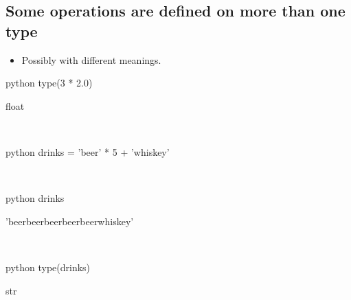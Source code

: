 \documentclass[aspectratio=1610,slidestop]{beamer}
\begin{document}
\subsection{Some operations are defined on more than one type}
\begin{pframe}
 \begin{itemize}
  \item Possibly with different meanings.
 \end{itemize}

 \begin{ipython}
  \begin{pythonin}{python}
type(3 * 2.0)
  \end{pythonin}
  \begin{pythonout}
float
  \end{pythonout}
  \\

  \begin{pythonin}{python}
drinks = 'beer' * 5 + 'whiskey'
  \end{pythonin}
  \\
  \begin{pythonin}{python}
drinks
  \end{pythonin}
  \begin{pythonout}
'beerbeerbeerbeerbeerwhiskey'
  \end{pythonout}
  \\

  \begin{pythonin}{python}
type(drinks)
  \end{pythonin}
  \begin{pythonout}
str
  \end{pythonout}
 \end{ipython}
\end{pframe}
\end{document}
